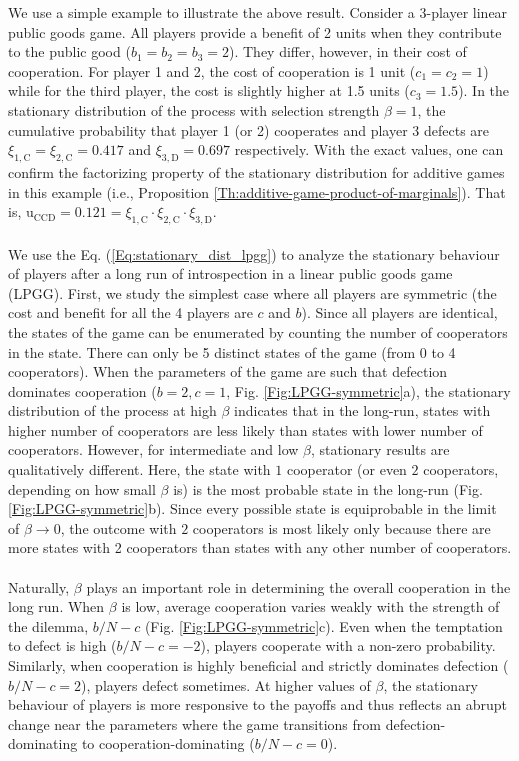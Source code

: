 \documentclass[11pt]{article}
\theoremstyle{plainCl1}
\theoremstyle{plainCl2}
\newcommand{\C}{\mathrm{C}}
\newcommand{\D}{\mathrm{D}}
\begin{document}
\noindent We use a simple example to illustrate the above result. Consider a 3-player linear public goods game. All players provide a benefit of 2 units when they contribute to the public good ($b_1 = b_2 = b_3 = 2$). They differ, however, in their cost of cooperation. For player 1 and 2, the cost of cooperation is 1 unit ($c_1 = c_2 = 1$) while for the third player, the cost is slightly higher at 1.5 units ($c_3 = 1.5$). In the stationary distribution of the process with selection strength $\beta = 1$, the cumulative probability that player 1 (or 2) cooperates and player 3 defects are $\xi_{1,\C} = \xi_{2,\C}= 0.417$ and $\xi_{3,\D} = 0.697$ respectively. With the exact values, one can confirm the factorizing property of the stationary distribution for additive games in this example (i.e., Proposition \ref{Th:additive-game-product-of-marginals}). That is, $\mathrm{u}_{\C\C\D} = 0.121 = \xi_{1,\C} \cdot \xi_{2,\C} \cdot \xi_{3,\D}$. \\ \\
\noindent We use the Eq. (\ref{Eq:stationary_dist_lpgg}) to analyze the stationary behaviour of players after a long run of introspection in a linear public goods game (LPGG). First, we study the simplest case where all players are symmetric (the cost and benefit for all the 4 players are $c$ and $b$). Since all players are identical, the states of the game can be enumerated by counting the number of cooperators in the state. There can only be 5 distinct states of the game (from 0 to 4 cooperators).
When the parameters of the game are such that defection dominates cooperation ($b = 2, c = 1$, Fig. \ref{Fig:LPGG-symmetric}a), the stationary distribution of the process at high $\beta$ indicates that in the long-run, states with higher number of cooperators are less likely than states with lower number of cooperators. However, for intermediate and low $\beta$, stationary results are qualitatively different. Here, the state with $1$ cooperator (or even $2$ cooperators, depending on how small $\beta$ is) is the most probable state in the long-run (Fig. \ref{Fig:LPGG-symmetric}b). Since every possible state is equiprobable in the limit of $\beta \to 0$, the outcome with $2$ cooperators is most likely only because there are more states with 2 cooperators than states with any other number of cooperators. \\ \\
\noindent Naturally, $\beta$ plays an important role in determining the overall cooperation in the long run. When $\beta$ is low, average cooperation varies weakly with the strength of the dilemma, $b/N - c$ (Fig. \ref{Fig:LPGG-symmetric}c). Even when the temptation to defect is high ($b/N - c = -2$), players cooperate with a non-zero probability. Similarly, when cooperation is highly beneficial and strictly dominates defection ($b/N - c = 2$), players defect sometimes. At higher values of $\beta$, the stationary behaviour of players is more responsive to the payoffs and thus reflects an abrupt change near the parameters where the game transitions from defection-dominating to cooperation-dominating ($b/N - c = 0$).  \\ \\
\end{document}
